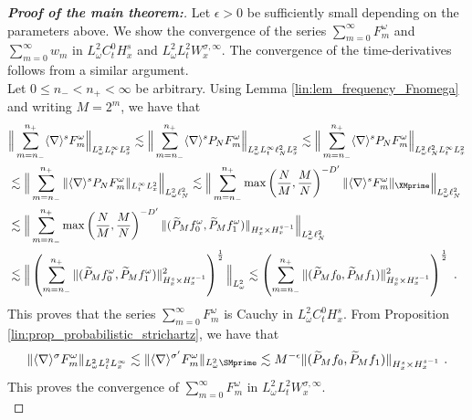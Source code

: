 \documentclass[11pt]{article}
\begin{document}
\begin{proof}[\textbf{Proof of the main theorem:}]
Let \( \epsilon > 0 \) be sufficiently small depending on the parameters above. We show the convergence of the series \( \sum_{m=0}^{\infty} F_m^\omega \) and \( \sum_{m=0}^\infty w_m \) in  \( L_\omega ^2C_t^0 H_x^s \) and \( L_\omega^2 L_t^2 W_x^{\sigma,\infty} \). The convergence of the time-derivatives follows from a similar argument. \\
Let \( 0 \leq n_- < n_+ < \infty \) be arbitrary. Using Lemma \ref{lin:lem_frequency_Fnomega} and writing \( M=2^m \), we have that
\begin{align*}
&\Big \| \sum_{m=n_-}^{n_+} \langle \nabla \rangle^s F_m^\omega \Big \|_{L_\omega^2 L_t^\infty L_x^2} 
\lesssim \Big \| \sum_{m=n_-}^{n_+} \langle \nabla \rangle^s P_N F_m^\omega \Big \|_{L_\omega^2 L_t^\infty \ell_N^2 L_x^2}
\lesssim  \Big \| \sum_{m=n_-}^{n_+} \langle \nabla \rangle^s P_N F_m^\omega \Big \|_{L_\omega^2 \ell_N^2 L_t^\infty  L_x^2}\\
&\lesssim \Big \| \sum_{m=n_-}^{n_+} \| \langle \nabla \rangle^s P_N F_m^\omega \|_{L_t^\infty L_x^2} \Big \|_{L_\omega^2 \ell_N^2} 
\lesssim \Big \| \sum_{m=n_-}^{n_+} \max\left( \frac{N}{M}, \frac{M}{N} \right)^{-D^\prime} \| \langle \nabla \rangle^s  F_m^\omega \|_{\XMprime} \Big \|_{L_\omega^2 \ell_N^2} \\
&\lesssim  \Big \| \sum_{m=n_-}^{n_+} \max\left( \frac{N}{M}, \frac{M}{N} \right)^{-D^\prime} \| ( \widetilde{P}_M f_0^\omega , \widetilde{P}_M f_1^\omega) \|_{H_x^s\times H_x^{s-1}} \Big \|_{L_\omega^2 \ell_N^2}\\ 
&\lesssim \Big \| \left ( \sum_{m=n_-}^{n_+} \| (\widetilde{P}_M f_0^\omega, \widetilde{P}_M f_1^\omega) \|_{H_x^s\times H_x^{s-1}}^2 \right)^{\frac{1}{2}} \Big \|_{L_\omega^2} 
\lesssim \left(  \sum_{m=n_-}^{n_+} \| (\widetilde{P}_M f_0, \widetilde{P}_M f_1) \|_{H_x^s\times H_x^{s-1}}^2 \right)^{\frac{1}{2}} ~. 
\end{align*}
This proves that the series \( \sum_{m=0}^\infty F_m^\omega \) is Cauchy in \( L_\omega^2 C_t^0 H_x^s \). From Proposition \ref{lin:prop_probabilistic_strichartz}, we have that
\begin{equation}\label{fin:eq_Fm_Strichartz}
\| \langle \nabla \rangle^{\sigma} F_m^\omega \|_{L_\omega^2 L_t^2 L_x^\infty} \lesssim \| \langle \nabla \rangle^{\sigma^\prime} F_m^\omega \|_{L_\omega^2 \SMprime} \lesssim M^{-\epsilon}  \| (\widetilde{P}_M f_0, \widetilde{P}_M f_1) \|_{H_x^s\times H_x^{s-1}}~. 
\end{equation}
This proves the convergence of \( \sum_{m=0}^\infty F_m^\omega \) in \( L_\omega^2 L_t^2 W_x^{\sigma,\infty} \). \\

\end{proof}
\end{document}
